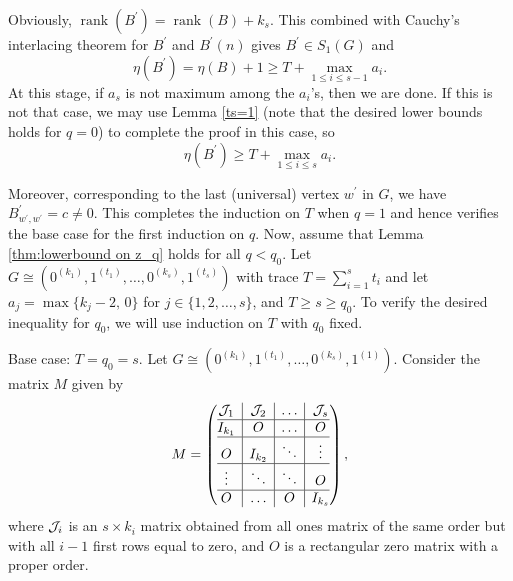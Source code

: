 \documentclass[3p,times,12pt]{article}
\DeclareMathOperator{\rank}{rank}
\begin{document}
Obviously, $\rank(B^{\prime})=\rank(B)+k_s$. This combined with Cauchy's interlacing theorem for $B^{\prime}$ and $B^{\prime}(n)$ gives $B^{\prime}\in S_1(G)$ and
 \begin{equation}\nonumber
\eta(B^{\prime})=\eta(B)+1\ge T+\max_{1\le i \le s-1}a_i.
 \end{equation} 
 At this stage, if $a_s$ is not maximum among the $a_i$'s, then we are done. If this is not that case, we may use Lemma \ref{ts=1} (note that the desired lower bounds holds for $q=0$) to complete the proof in this case, so
 \begin{equation}\label{z_q3}
 \eta(B^{\prime})\ge T+\max_{1\le i \le s}a_i.
 \end{equation}
 
 Moreover, corresponding to the last (universal) vertex $w^{\prime}$ in $G$, we have $B^{\prime}_{w^{\prime}, w^{\prime}}=c\neq 0$. This completes the induction on $T$ when $q=1$ and hence verifies the base case for the first induction on $q$. Now, assume that Lemma \ref{thm:lowerbound on z_q} holds for all $q <q_0$.
 Let $G\cong (0^{(k_1)}, 1^{(t_1)}, \ldots,0^{(k_s)}, 1^{(t_s)})$ with trace $T=\sum_{i=1}^s t_i$ and let $a_j=\max\{k_j-2,\,0\}$ for $j\in \{1,2,\ldots,s\}$, and $T \geq s \geq q_0$. To verify the desired inequality for $q_0$, we will use induction on $T$ with $q_0$ fixed.
 
 Base case: $T=q_0=s$. Let $G\cong (0^{(k_1)}, 1^{(t_1)}, \ldots,0^{(k_s)}, 1^{(1)})$. Consider the matrix $M$ given by
  $$M=\left(\begin{array}{@{}c|c|c|c@{}}
    {\cal J}_1 & {\cal J}_2 &\ldots & {\cal J}_{s} \\\hline
    I_{k_1} & O & \ldots & O \\\hline
    O  &  I_{k_2} & \ddots & \vdots \\\hline
    \vdots & \ddots &\ddots & O\\\hline
        O & \ldots &O & I_{k_s}
  \end{array}\right),$$ where ${\cal J}_i$ is an $s \times k_i$ matrix obtained from all ones matrix of the same order but with all $i-1$ first rows equal to zero, and $O$ is a rectangular zero matrix  with a proper order. 
\end{document}
